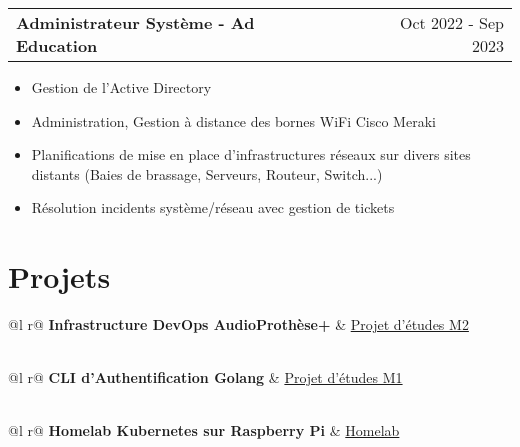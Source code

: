 \documentclass[a4paper,11pt]{article}
\makeatletter
\newenvironment{joblong}[2]
    {
    \begin{tabularx}{\linewidth}{@{}l X r@{}}
    \textbf{#1} & \hfill &  #2 \\[3.75pt]
    \end{tabularx}
    \begin{minipage}[t]{\linewidth}
    \begin{itemize}[nosep,after=\strut, leftmargin=1em, itemsep=3pt,label=--]
    }
    {
    \end{itemize}
    \end{minipage}    
    }
\makeatother
\begin{document}
\begin{joblong}{Administrateur Système - Ad Education}{Oct 2022 - Sep 2023}
\item Gestion de l'Active Directory
\item Administration, Gestion à distance des bornes WiFi Cisco Meraki
\item Planifications de mise en place d'infrastructures réseaux sur divers sites distants (Baies de brassage, Serveurs, Routeur, Switch...)
\item Résolution incidents système/réseau avec gestion de tickets
\end{joblong}
  
\section{Projets}

\begin{tabularx}{\linewidth}{ @{}l r@{} }
\textbf{Infrastructure DevOps AudioProthèse+} & \hfill \href{https://github.com/cheng-alain}{Projet d'études M2} \\[3.75pt]
  \\
\end{tabularx}

\begin{tabularx}{\linewidth}{ @{}l r@{} }
\textbf{CLI d'Authentification Golang} & \hfill \href{https://github.com/cheng-alain}{Projet d'études M1} \\[3.75pt]
  \\
\end{tabularx}

\begin{tabularx}{\linewidth}{ @{}l r@{} }
\textbf{Homelab Kubernetes sur Raspberry Pi} & \hfill \href{https://github.com/cheng-alain}{Homelab} \\[3.75pt]
  \\
\end{tabularx}
\end{document}

